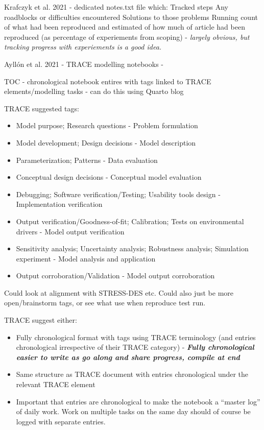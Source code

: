 Krafczyk et al. 2021 - dedicated notes.txt file which: Tracked steps Any roadblocks or difficulties encountered Solutions to those problems Running count of what had been reproduced and estimated of how much of article had been reproduced (as percentage of experiements from scoping)\autocite{krafczyk_learning_2021} - \textit{largely obvious, but tracking progress with experiements is a good idea.}

Ayllón et al. 2021\autocite{ayllon_keeping_2021} - TRACE modelling notebooks - 

TOC - chronological notebook entires with tags linked to TRACE elements/modelling tasks - can do this using Quarto blog

TRACE suggested tags:
\begin{itemize}
    \item Model purpose; Research questions - Problem formulation
    \item Model development; Design decisions - Model description
    \item Parameterization; Patterns - Data evaluation
    \item Conceptual design decisions - Conceptual model evaluation
    \item Debugging; Software verification/Testing; Usability tools design - Implementation verification
    \item Output verification/Goodness-of-fit; Calibration; Tests on environmental drivers - Model output verification
    \item Sensitivity analysis; Uncertainty analysis; Robustness analysis; Simulation experiment - Model analysis and application
    \item Output corroboration/Validation - Model output corroboration
\end{itemize}

Could look at alignment with STRESS-DES etc. Could also just be more open/brainstorm tags, or see what use when reproduce test run.

TRACE suggest either:
\begin{itemize}
    \item Fully chronological format with tags using TRACE terminology (and entries chronological irrespective of their TRACE category) - \textit\textbf{{Fully chronological} easier to write as go along and share progress, compile at end}
    \item Same structure as TRACE document with entries chronological under the relevant TRACE element
    \item Important that entries are chronological to make the notebook a “master log” of daily work. Work on multiple tasks on the same day should of course be logged with separate entries.
\end{itemize}

